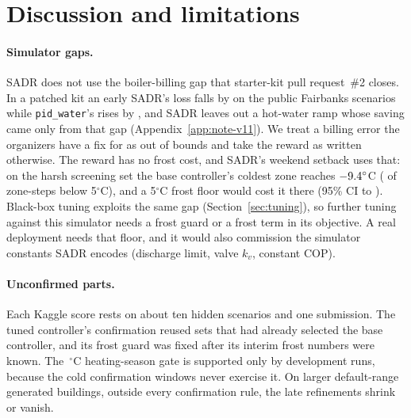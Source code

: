 \documentclass{article}
\begin{document}
\section{Discussion and limitations}
\label{sec:limits}
\paragraph{Simulator gaps.} SADR does not use the boiler-billing gap that starter-kit pull request~\#2 closes. In a patched kit an early SADR's loss falls by \RFivePrTwoVSevenRelAbs{} on the \RFivePrTwoVSevenN{} public Fairbanks scenarios while \texttt{pid\_water}'s rises by \RFivePrTwoPidRelAbs, and SADR leaves out a hot-water ramp whose saving came only from that gap (Appendix~\ref{app:note-v11}). We treat a billing error the organizers have a fix for as out of bounds and take the reward as written otherwise. The reward has no frost cost, and SADR's weekend setback uses that: on the harsh screening set the base controller's coldest zone reaches $-9.4^\circ$C (\RElvBelowFiveHS{} of zone-steps below 5$^\circ$C), and a 5$^\circ$C frost floor would cost it \RElvFrostHsRel{} there (95\% CI \RElvFrostHsLo{} to \RElvFrostHsHi). Black-box tuning exploits the same gap (Section~\ref{sec:tuning}), so further tuning against this simulator needs a frost guard or a frost term in its objective. A real deployment needs that floor, and it would also commission the simulator constants SADR encodes (discharge limit, valve $k_v$, constant COP).

\paragraph{Unconfirmed parts.} Each Kaggle score rests on about ten hidden scenarios and one submission. The tuned controller's confirmation reused sets that had already selected the base controller, and its frost guard was fixed after its interim frost numbers were known. The \RTenSeasonOatC\,$^\circ$C heating-season gate is supported only by development runs, because the cold confirmation windows never exercise it. On larger default-range generated buildings, outside every confirmation rule, the late refinements shrink or vanish.
\end{document}
